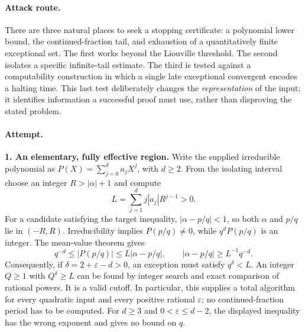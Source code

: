 \documentclass[11pt,a4paper]{article}
\newcommand{\eps}{\varepsilon}
\begin{document}
\paragraph{Attack route.}
There are three natural places to seek a stopping certificate: a polynomial
lower bound, the continued-fraction tail, and exhaustion of a quantitatively
finite exceptional set. The first works beyond the Liouville threshold.
The second isolates a specific infinite-tail estimate. The third is tested
against a computability construction in which a single late exceptional
convergent encodes a halting time. This last test deliberately changes the
\emph{representation} of the input; it identifies information a successful
proof must use, rather than disproving the stated problem.

\paragraph{Attempt.}
\textbf{1. An elementary, fully effective region.}
Write the supplied irreducible polynomial as
$P(X)=\sum_{j=0}^{d}a_jX^j$, with $d\ge2$.
From the isolating interval choose an integer $R>|\alpha|+1$ and compute
\[
 L=\sum_{j=1}^{d}j|a_j|R^{j-1}>0.
\]
For a candidate satisfying the target inequality, $|\alpha-p/q|<1$,
so both $\alpha$ and $p/q$ lie in $(-R,R)$. Irreducibility implies
$P(p/q)\ne0$, while $q^dP(p/q)$ is an integer. The mean-value theorem gives
\begin{equation}\label{statement:liouville}
 q^{-d}\le |P(p/q)|\le L|\alpha-p/q|,
 \qquad |\alpha-p/q|\ge L^{-1}q^{-d}.
\end{equation}
Consequently, if $\delta=2+\eps-d>0$, an exception must satisfy
$q^\delta<L$. An integer $Q\ge1$ with $Q^\delta\ge L$ can be found by
integer search and exact comparison of rational powers. It is a valid
cutoff. In particular, this supplies a total algorithm for every quadratic
input and every positive rational $\eps$; no continued-fraction period has
to be computed. For $d\ge3$ and $0<\eps\le d-2$, the displayed inequality
has the wrong exponent and gives no bound on $q$.
\end{document}
